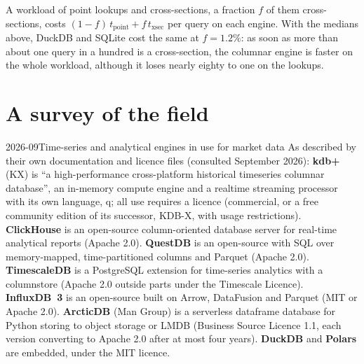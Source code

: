 \label{lst:pl:time-series-databases-and-the-alternatives:bench}

\begin{example}\label{ex:pl:time-series-databases-and-the-alternatives:mix}
A workload of point lookups and cross-sections, a fraction $f$ of them cross-sections, costs $(1-f)\,t_{\mathrm{point}} +
f\,t_{\mathrm{xsec}}$ per query on each engine. With the medians above, DuckDB and SQLite cost the same at $f = 1.2\%$: as soon as
more than about one query in a hundred is a cross-section, the columnar engine is faster on the whole workload, although it
loses nearly eighty to one on the lookups.
\end{example}

\section{A survey of the field}

\begin{dated}{2026-09}{Time-series and analytical engines in use for market data}\label{dat:pl:time-series-databases-and-the-alternatives:survey}
As described by their own documentation and licence files (consulted September 2026): \textbf{kdb+} (KX) is ``a high-performance
cross-platform historical timeseries columnar database'', an in-memory compute engine and a realtime streaming processor with its
own language, q; all use requires a licence (commercial, or a free community edition of its successor, KDB-X, with usage
restrictions). \textbf{ClickHouse} is an open-source column-oriented database server for real-time analytical reports (Apache
2.0). \textbf{QuestDB} is an open-source  with SQL over memory-mapped, time-partitioned columns and Parquet
(Apache 2.0). \textbf{TimescaleDB} is a PostgreSQL extension for time-series analytics with a columnstore (Apache 2.0 outside
parts under the Timescale Licence). \textbf{InfluxDB~3} is an open-source  built on Arrow, DataFusion and
Parquet (MIT or Apache 2.0). \textbf{ArcticDB} (Man Group) is a serverless dataframe database for Python storing to object
storage or LMDB (Business Source Licence 1.1, each version converting to Apache 2.0 after at most four years). \textbf{DuckDB}
and \textbf{Polars} are embedded, under the MIT licence.
\end{dated}

